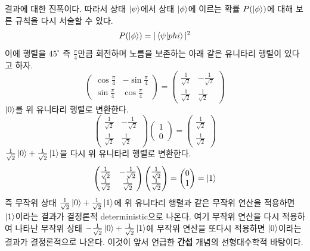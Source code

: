 \documentclass[a4paper,chapter,atbegshi]{oblivoir}
\begin{document}
결과에 대한 진폭이다. 따라서 상태 $\ket\psi$에서 상태 $\ket\phi$에 이르는
확률 $P(\ket\phi)$에 대해 보른 규칙을 다시 서술할 수 있다.
\[
  P(\ket\phi)=|\braket{\psi|phi}|^2
\]
이에 행렬을 $45^{\circ}$ 즉 $\frac{\pi}{4}$만큼 회전하며 노름을 보존하는
아래 같은 유니타리 행렬이 있다고 하자.
\[
  \begin{pmatrix}
    \cos\frac{\pi}{4} &-\sin\frac{\pi}{4}\\
    \sin\frac{\pi}{4} &\cos\frac{\pi}{4}
  \end{pmatrix}
  = \begin{pmatrix}
    \frac{1}{\sqrt{2}} &-\frac{1}{\sqrt{2}} \\
    \frac{1}{\sqrt{2}} &\frac{1}{\sqrt2}
  \end{pmatrix}
\]
$\ket0$를 위 유니타리 행렬로 변환한다.
\begin{equation}\label{eq:1-2}
  \begin{pmatrix}
    \frac{1}{\sqrt{2}} &-\frac{1}{\sqrt{2}} \\
    \frac{1}{\sqrt{2}} &\frac{1}{\sqrt2}
  \end{pmatrix}
  \begin{pmatrix}
    1\\0
  \end{pmatrix}
  =\begin{pmatrix}
    \frac{1}{\sqrt2}\\\frac{1}{\sqrt2}
  \end{pmatrix}
\end{equation}
$\frac{1}{\sqrt2}\ket{0}+\frac{1}{\sqrt2}\ket{1}$을 다시 위 유니타리 행렬로
변환한다.
\[
  \begin{pmatrix}
    \frac{1}{\sqrt{2}} &-\frac{1}{\sqrt{2}} \\
    \frac{1}{\sqrt{2}} &\frac{1}{\sqrt2}
  \end{pmatrix}
  \begin{pmatrix}
    \frac{1}{\sqrt2}\\\frac{1}{\sqrt2}
  \end{pmatrix}
  =\begin{pmatrix}0\\1\end{pmatrix}=\ket{1}
\]
즉 무작위 상태 $\frac{1}{\sqrt2}\ket{0}+\frac{1}{\sqrt2}\ket{1}$에 위 유니타리
행렬과 같은 무작위 연산을 적용하면 $\ket{1}$이라는 결과가 결정론적{\tiny
deterministic}으로 나온다. 여기 무작위 연산을 다시 적용하여 나타난 무작위 상태
 $-\frac{1}{\sqrt2}\ket{0}+\frac{1}{\sqrt2}\ket{1}$에 무작위 연산을 또다시
 적용하면 $\ket{0}$이라는 결과가 결정론적으로 나온다. 이것이 앞서 언급한
 \textbf{간섭} 개념의 선형대수학적 바탕이다. 
\end{document}

